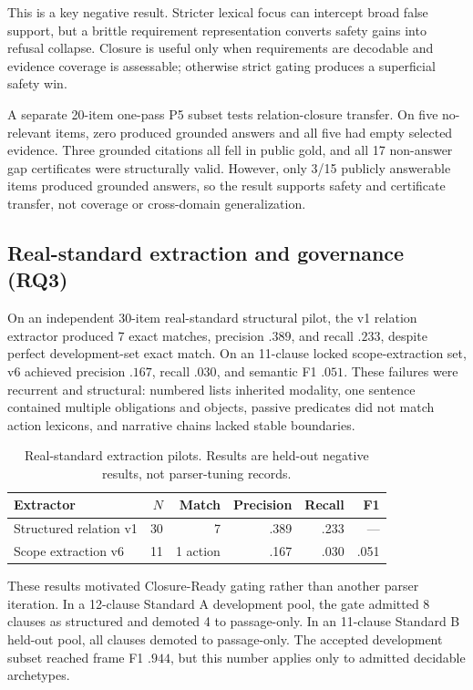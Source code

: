\documentclass[11pt]{article}
\begin{document}
This is a key negative result. Stricter lexical focus can intercept broad false support, but a brittle requirement representation converts safety gains into refusal collapse. Closure is useful only when requirements are decodable and evidence coverage is assessable; otherwise strict gating produces a superficial safety win.

A separate 20-item one-pass P5 subset tests relation-closure transfer. On five no-relevant items, zero produced grounded answers and all five had empty selected evidence. Three grounded citations all fell in public gold, and all 17 non-answer gap certificates were structurally valid. However, only 3/15 publicly answerable items produced grounded answers, so the result supports safety and certificate transfer, not coverage or cross-domain generalization.

\subsection{Real-standard extraction and governance (RQ3)}

On an independent 30-item real-standard structural pilot, the v1 relation extractor produced 7 exact matches, precision $.389$, and recall $.233$, despite perfect development-set exact match. On an 11-clause locked scope-extraction set, v6 achieved precision $.167$, recall $.030$, and semantic F1 $.051$. These failures were recurrent and structural: numbered lists inherited modality, one sentence contained multiple obligations and objects, passive predicates did not match action lexicons, and narrative chains lacked stable boundaries.

\begin{table}[t]
\centering
\caption{Real-standard extraction pilots. Results are held-out negative results, not parser-tuning records.}
\label{tab:extraction}
\small
\begin{tabular}{@{}lrrrrr@{}}
\toprule
Extractor & $N$ & Match & Precision & Recall & F1 \\
\midrule
Structured relation v1 & 30 & 7 & .389 & .233 & --- \\
Scope extraction v6 & 11 & 1 action & .167 & .030 & .051 \\
\bottomrule
\end{tabular}
\end{table}

These results motivated Closure-Ready gating rather than another parser iteration. In a 12-clause Standard A development pool, the gate admitted 8 clauses as structured and demoted 4 to passage-only. In an 11-clause Standard B held-out pool, all clauses demoted to passage-only. The accepted development subset reached frame F1 $.944$, but this number applies only to admitted decidable archetypes.
\end{document}
